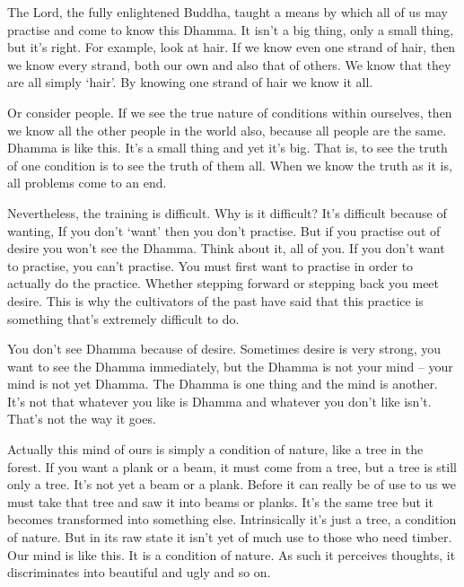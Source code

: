 The Lord, the fully enlightened Buddha, taught a means by which all of us may practise and come to know this Dhamma. It isn't a big thing, only a small thing, but it's right. For example, look at hair. If we know even one strand of hair, then we know every strand, both our own and also that of others. We know that they are all simply `hair'. By knowing one strand of hair we know it all.

Or consider people. If we see the true nature of conditions within ourselves, then we know all the other people in the world also, because all people are the same. Dhamma is like this. It's a small thing and yet it's big. That is, to see the truth of one condition is to see the truth of them all. When we know the truth as it is, all problems come to an end.

Nevertheless, the training is difficult. Why is it difficult? It's difficult because of wanting,  If you don't `want' then you don't practise. But if you practise out of desire you won't see the Dhamma. Think about it, all of you. If you don't want to practise, you can't practise. You must first want to practise in order to actually do the practice. Whether stepping forward or stepping back you meet desire. This is why the cultivators of the past have said that this practice is something that's extremely difficult to do.

You don't see Dhamma because of desire. Sometimes desire is very strong, you want to see the Dhamma immediately, but the Dhamma is not your mind -- your mind is not yet Dhamma. The Dhamma is one thing and the mind is another. It's not that whatever you like is Dhamma and whatever you don't like isn't. That's not the way it goes.

Actually this mind of ours is simply a condition of nature, like a tree in the forest. If you want a plank or a beam, it must come from a tree, but a tree is still only a tree. It's not yet a beam or a plank. Before it can really be of use to us we must take that tree and saw it into beams or planks. It's the same tree but it becomes transformed into something else. Intrinsically it's just a tree, a condition of nature. But in its raw state it isn't yet of much use to those who need timber. Our mind is like this. It is a condition of nature. As such it perceives thoughts, it discriminates into beautiful and ugly and so on.


